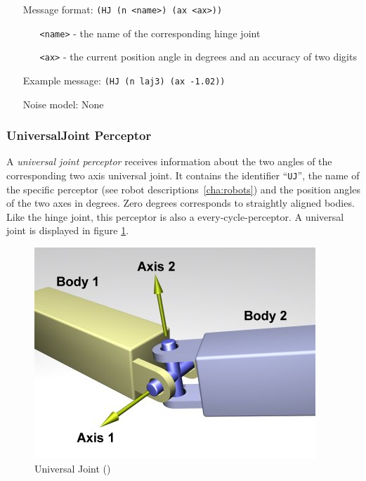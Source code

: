 
\begin{itemize}
	\item[Message format:] \texttt{(HJ (n <name>) (ax <ax>))}
		\begin{itemize}
		  \item[\texttt{<name>} -] the name of the corresponding hinge joint
		  \item[\texttt{<ax>} -] the current position angle in degrees and an accuracy
		  of two digits
		\end{itemize}
	\item[Example message:] \texttt{(HJ (n laj3) (ax -1.02))}
	\item[Noise model:] None
\end{itemize}



\subsubsection{UniversalJoint Perceptor}
\label{sec:UJP}
A \emph{universal joint perceptor} receives information about the two angles of
the corresponding two axis universal joint. It contains the identifier
``\texttt{UJ}'', the name of the specific perceptor (see robot
descriptions~\ref{cha:robots}) and the position angles of the two axes in
degrees. Zero degrees corresponds to straightly aligned bodies. Like the hinge
joint, this perceptor is also a every-cycle-perceptor. A universal joint is
displayed in figure \ref{ode:universaljoint}.

\begin{figure}[htbp]
  \begin{center}
	\includegraphics[scale=0.6]{fig/UniversalJoint.png}
    \caption{Universal Joint (\cite{ODEManual})}
    \label{ode:universaljoint}
  \end{center}
\end{figure}
 
